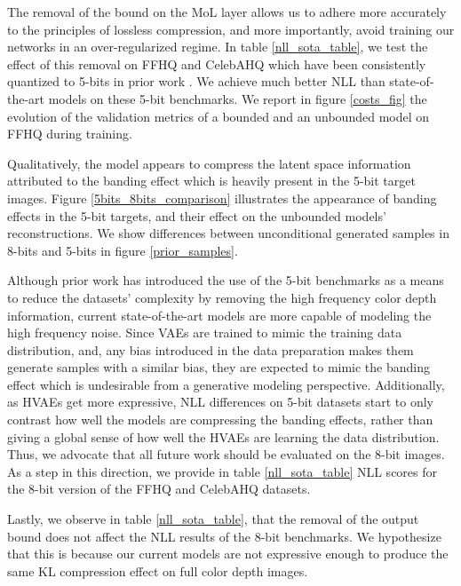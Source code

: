 \documentclass{article}
\begin{document}
The removal of the bound on the MoL layer allows us to adhere more accurately to the principles of lossless compression, and more importantly, avoid training our networks in an over-regularized regime\cite{yu2020frombayestoit}. In table \ref{nll_sota_table}, we test the effect of this removal on FFHQ  and CelebAHQ  which have been consistently quantized to 5-bits in prior work \cite{child2021very, vahdat2020nvae, 5bits_1, 5bits_2, ma2019macow, spn, anf, locally, kingma2018glow}.
We achieve much better NLL than state-of-the-art models on these 5-bit benchmarks. We report in figure \ref{costs_fig} the evolution of the validation metrics of a bounded and an unbounded model on FFHQ  during training.



Qualitatively, the model appears to compress the latent space information attributed to the banding effect \cite{banding_1, banding_2} which is heavily present in the 5-bit target images. Figure \ref{5bits_8bits_comparison} illustrates the appearance of banding effects in the 5-bit targets, and their effect on the unbounded models' reconstructions. We show differences between unconditional generated samples in 8-bits and 5-bits in figure \ref{prior_samples}.

Although prior work\cite{kingma2018glow} has introduced the use of the 5-bit benchmarks as a means to reduce the datasets' complexity by removing the high frequency color depth information, current state-of-the-art models are more capable of modeling the high frequency noise. Since VAEs are trained to mimic the training data distribution, and, any bias introduced in the data preparation makes them generate samples with a similar bias, they are expected to mimic the banding effect which is undesirable from a generative modeling perspective. Additionally, as HVAEs get more expressive, NLL differences on 5-bit datasets start to only contrast how well the models are compressing the banding effects, rather than giving a global sense of how well the HVAEs are learning the data distribution. Thus, we advocate that all future work should be evaluated on the 8-bit images. As a step in this direction, we provide in table \ref{nll_sota_table} NLL scores for the 8-bit version of the FFHQ  and CelebAHQ  datasets.

Lastly, we observe in table \ref{nll_sota_table}, that the removal of the output bound does not affect the NLL results of the 8-bit benchmarks. We hypothesize that this is because our current models are not expressive enough to produce the same KL compression effect on full color depth images.
\end{document}
